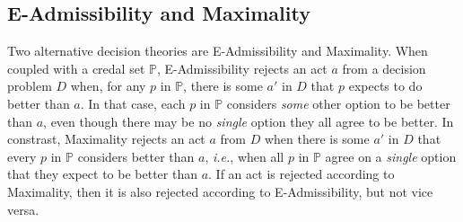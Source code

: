 \documentclass[a4paper,final]{article}
\newtheorem{definition}[theorem]{Definition}
\renewcommand\P{\mathbb{P}} %
\newcommand\Exp{\mathsf{Exp}}
\newcommand\U{\mathfrak{U}} %
\newcommand\Maximin{\Gamma}
\renewcommand\S{\mathcal{S}}
\newcommand\s{\mathsf{s}}
\newcommand{\IB}{\mathbb{B}}
\newcommand{\IP}{\P}
\newcommand{\todoold}[2][]{\todo[backgroundcolor=white,bordercolor=orange!10,linecolor=gray!10, #1,caption={},textcolor=gray]{Pre-rev: #2}}
\newcommand{\todooldinfo}[2][]{\todoold[#1]{#2}}
\renewcommand{\leq}{\leqslant}
\newenvironment{CCM rewritten}
{\begingroup\color{blue}} %
{\endgroup}              %
\begin{document}


\subsection{E-Admissibility and Maximality}\label{sect:e-admiss}\label{sect:Max}


{ Two alternative decision theories are E-Admissibility and Maximality. When coupled with a credal set $\IP$, E-Admissibility rejects an act $a$ from a decision problem $D$ when, for any $p$ in $\IP$, there is some $a'$ in $D$ that $p$ expects to do better than $a$. In that case, each $p$ in $\IP$ considers \emph{some} other option to be better than $a$, even though there may be no \emph{single} option they all agree to be better. In constrast, Maximality rejects an act $a$ from $D$ when there is some $a'$ in $D$ that every $p$ in $\IP$ considers better than $a$, \emph{i.e.}, when all $p$ in $\IP$ agree on a \emph{single} option that they expect to be better than $a$. If an act is rejected according to Maximality, then it is also rejected according to E-Admissibility, but not vice versa.}
\end{document}
